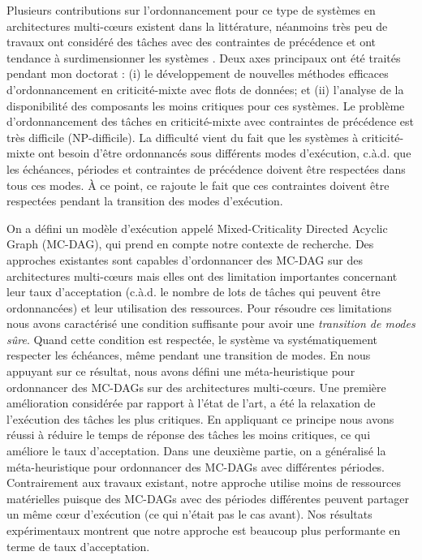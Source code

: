 \documentclass{article}
\begin{document}
Plusieurs contributions sur l'ordonnancement pour ce type de systèmes en architectures  multi-c\oe{}urs 
existent dans la littérature, néanmoins très peu de travaux ont considéré des tâches avec des contraintes de 
précédence et ont tendance à surdimensionner les systèmes . Deux axes principaux ont été traités pendant 
mon doctorat : (i) le développement de nouvelles méthodes efficaces d'ordonnancement en criticité-mixte 
avec flots de données; et (ii) l'analyse de la disponibilité des composants les moins critiques pour ces 
systèmes. Le problème d'ordonnancement des tâches en criticité-mixte avec contraintes de précédence est 
très difficile (NP-difficile). La difficulté vient du fait que les systèmes à criticité-mixte ont besoin d'être 
ordonnancés sous différents modes d'exécution, c.à.d. que les échéances, périodes et contraintes de 
précédence doivent être respectées dans tous ces modes. À ce point, ce rajoute le fait que ces contraintes 
doivent être respectées pendant la transition des modes d'exécution.

\vspace{.5cm}
On a défini un modèle d'exécution appelé Mixed-Criticality Directed Acyclic Graph (MC-DAG), qui prend en 
compte notre contexte de recherche. Des approches existantes sont capables d'ordonnancer des MC-DAG 
sur des architectures multi-c\oe{}urs  mais elles ont des limitation importantes concernant leur taux 
d'acceptation (c.à.d. le nombre de lots de tâches qui peuvent être ordonnancées) et leur utilisation des 
ressources. Pour résoudre ces limitations nous avons caractérisé une condition suffisante pour avoir une 
\textit{transition de modes sûre}. Quand cette condition est respectée, le système va systématiquement 
respecter les échéances, même pendant une transition de modes. En nous appuyant sur ce résultat, 
nous avons défini une méta-heuristique pour ordonnancer des MC-DAGs sur des architectures 
multi-c\oe{}urs. Une première amélioration considérée par rapport à l'état de l'art, a été la relaxation de 
l'exécution des tâches les plus critiques. En appliquant ce principe nous avons réussi à réduire le temps de 
réponse des tâches les moins critiques, ce qui améliore le taux d'acceptation. Dans une deuxième partie, on a 
généralisé la méta-heuristique pour ordonnancer des MC-DAGs avec différentes périodes. Contrairement 
aux travaux existant, notre approche utilise moins de ressources matérielles puisque des MC-DAGs avec des 
périodes différentes peuvent partager un même c\oe{}ur d'exécution (ce qui n'était pas le cas avant). Nos 
résultats expérimentaux montrent que notre approche est beaucoup plus performante en terme de taux 
d'acceptation.
\end{document}
